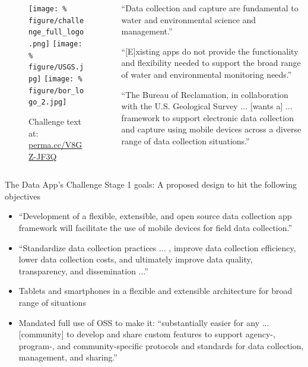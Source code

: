 \documentclass[unknownkeysallowed,usepdftitle=false, parskip=full, t]{beamer}
\newcommand{\secvariable}{nothing}
\newcommand{\mysection}[1]{\renewcommand{\secvariable}{#1}
}
\begin{document}
\mysection{challenge}


\begin{frame}\label{\secvariable}


  \begin{columns}[onlytextwidth]
  \begin{column}[c]{0.30\textwidth}
\begin{figure}

\texttt{[image: \%
figure/challenge\_full\_logo.png]}
\vspace{12 pt}
\texttt{[image: \%
figure/USGS.jpg]}
\vspace{12 pt}
\texttt{[image: \%
figure/bor\_logo\_2.jpg]}
\vspace{12 pt}
\caption{Challenge text at: \\  \url{perma.cc/V8GZ-JF3Q}}

\end{figure}
\end{column}
  \begin{column}[c]{0.65\textwidth}

\parbox{\linewidth}{



``Data collection and capture are fundamental to water and environmental science and management.''

``[E]xisting apps do not provide the functionality and flexibility needed to support the broad range of water and environmental monitoring needs.''

``The Bureau of Reclamation, in collaboration with the U.S. Geological Survey ... [wants a] ... framework to support electronic data collection and capture using mobile devices across a diverse range of data collection situations.''
}
\end{column}

\end{columns}


\end{frame}
\begin{frame}
\parbox{\linewidth}{
The Data App's Challenge Stage 1 goals: A proposed design to hit the following objectives

\begin{itemize}
\item ``Development of a flexible, extensible, and open source data collection app framework will facilitate the use of mobile devices for field data collection.''
\item ``Standardize data collection practices ... , improve data collection efficiency, lower data collection costs, and ultimately improve data quality, transparency, and dissemination ...''
\item Tablets and smartphones in a flexible and extensible architecture for broad range of situations
\item Mandated full use of OSS to make it: ``substantially easier for any ... [community] to develop and share custom features to support agency-, program-, and community-specific protocols and standards for data collection, management, and sharing.''
\end{itemize}
}
\end{frame}
\end{document}
